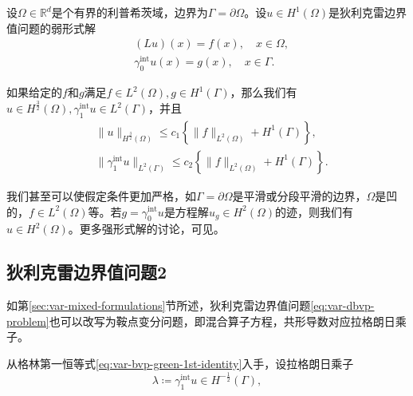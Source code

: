 \begin{theorem}
  \label{theorem:var-bvp-strong-solution}
  设$\Omega \in \mathbb{R}^d$是个有界的利普希茨域，边界为$\Gamma = \partial \Omega$。设$u \in H^{1}(\Omega)$是狄利克雷边界值问题的弱形式解
  \begin{equation*}
    \begin{split}
      &(L u)(x) = f(x), \quad x \in \Omega,\\
      &\gamma_{0}^{\text{int}} u(x) = g(x), \quad x \in \Gamma.
    \end{split}
  \end{equation*}

  如果给定的$f$和$g$满足$f \in L^{2}(\Omega), g \in H^{1}(\Gamma)$，那么我们有$u \in H^{\frac{3}{2}}(\Omega), \gamma_{1}^{\text{int}} u \in L^{2}(\Gamma)$，并且
  \begin{equation*}
  \begin{split}
  &\big\| u \big\|_{H^{\frac{3}{2}}(\Omega)} \le c_1
  \left\{
  \big\| f \big\|_{L^{2}(\Omega)} + H^{1}(\Gamma)
  \right\},\\
  & \big\| \gamma_{1}^{\text{int}} u \big\|_{L^{2}(\Gamma)} \le c_2 \left\{
  \big\| f \big\|_{L^{2}(\Omega)} + H^{1}(\Gamma)
  \right\}.
  \end{split}
  \end{equation*}
\end{theorem}

我们甚至可以使假定条件更加严格，如$\Gamma = \partial \Omega$是平滑或分段平滑的边界，$\Omega$是凹的，$f \in L^{2}(\Omega)$等。若$g = \gamma_{0}^{\text{int}} u $是方程解$u_g \in H^2(\Omega)$的迹，则我们有$u \in H^2(\Omega)$。更多强形式解的讨论，可见\cite{Demkowicz:2006ww,Demkowicz:2007ur}。

\subsection{狄利克雷边界值问题2}
\label{sec:var-bvp-dirichlet-lagrange}

如第\ref{sec:var-mixed-formulations}节所述，狄利克雷边界值问题\eqref{eq:var-dbvp-problem}也可以改写为鞍点变分问题，即混合算子方程，共形导数对应拉格朗日乘子\citep{Babuska:1973gu, Bramble:1981vv}。

从格林第一恒等式\eqref{eq:var-bvp-green-1st-identity}入手，设拉格朗日乘子
\begin{equation*}
  \lambda \coloneqq \gamma_1^{\text{int}} u \in H^{-\frac{1}{2}}(\Gamma),
\end{equation*}

